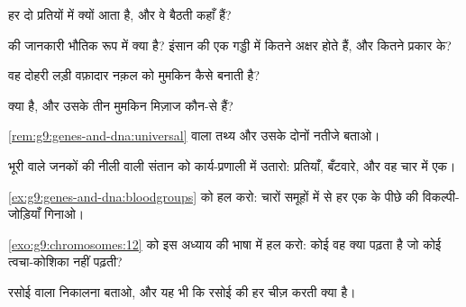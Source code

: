\begin{exercise}[$\star$]\label{exo:g9:genes-and-dna:2}
हर  दो प्रतियों में क्यों आता है, और वे बैठती कहाँ हैं?
\end{exercise}

\begin{exercise}[$\star$]\label{exo:g9:genes-and-dna:3}
 की जानकारी भौतिक रूप में क्या है? इंसान की एक गड्डी में कितने अक्षर
होते हैं, और कितने प्रकार के?
\end{exercise}

\begin{exercise}[$\star$]\label{exo:g9:genes-and-dna:4}
वह दोहरी लड़ी वफ़ादार नक़ल को मुमकिन कैसे बनाती है?
\end{exercise}

\begin{exercise}[$\star$]\label{exo:g9:genes-and-dna:5}
 क्या है, और उसके तीन मुमकिन मिज़ाज कौन-से हैं?
\end{exercise}

\begin{exercise}[$\star$]\label{exo:g9:genes-and-dna:6}
\cref{rem:g9:genes-and-dna:universal} वाला तथ्य और उसके दोनों नतीजे
बताओ।
\end{exercise}

\begin{exercise}[$\star\star$]\label{exo:g9:genes-and-dna:7}
भूरी  वाले जनकों की नीली  वाली संतान को कार्य-प्रणाली में
उतारो: प्रतियाँ, बँटवारे, और वह चार में एक।
\end{exercise}

\begin{exercise}[$\star\star$]\label{exo:g9:genes-and-dna:8}
\cref{ex:g9:genes-and-dna:bloodgroups} को हल करो: चारों समूहों में से
हर एक के पीछे की विकल्पी-जोड़ियाँ गिनाओ।
\end{exercise}

\begin{exercise}[$\star\star$]\label{exo:g9:genes-and-dna:9}
\cref{exo:g9:chromosomes:12} को इस अध्याय की भाषा में हल करो: कोई
 वह क्या पढ़ता है जो कोई त्वचा-कोशिका नहीं पढ़ती?
\end{exercise}

\begin{exercise}[$\star\star$]\label{exo:g9:genes-and-dna:10}
रसोई वाला निकालना बताओ, और यह भी कि रसोई की हर चीज़ करती क्या है।
\end{exercise}

